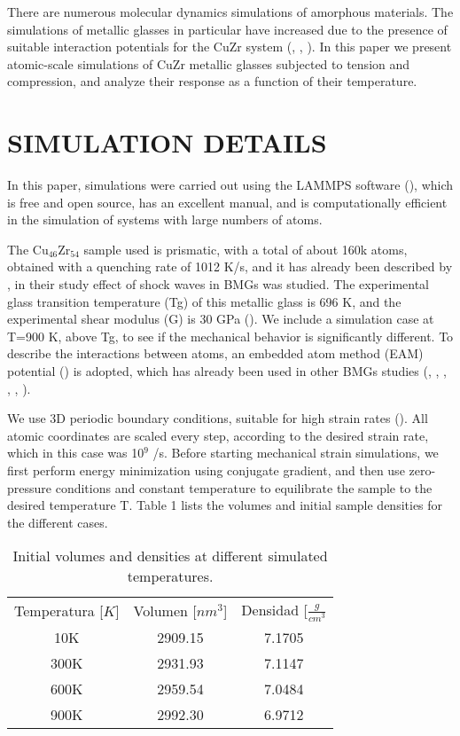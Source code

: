 There are numerous molecular dynamics simulations of amorphous materials. The simulations of metallic glasses in particular have increased due to the presence of suitable interaction potentials for the CuZr system (\cite{ogata06}, \cite{arman10}, \cite{guan10}). In this paper we present atomic-scale simulations of CuZr metallic glasses subjected to tension and compression, and analyze their response as a function of their temperature.

\section{SIMULATION DETAILS}
In this paper, simulations were carried out using the LAMMPS software (\cite{plimpton95}), which is free and open source, has an excellent manual, and is computationally efficient in the simulation of systems with large numbers of atoms.

The Cu$_{46}$Zr$_{54}$ sample used is prismatic, with a total of about 160k atoms, obtained with a quenching rate of 1012 K/s, and it has already been described by \cite{arman10}, in their study effect of shock waves in BMGs was studied. The experimental glass transition temperature (Tg) of this metallic glass is 696 K, and the experimental shear modulus (G) is 30 GPa (\cite{johnson05}). We include a simulation case at T=900 K, above Tg, to see if the mechanical behavior is significantly different. To describe the interactions between atoms, an embedded atom method (EAM) potential (\cite{daw84}) is adopted, which has already been used in other BMGs studies (\cite{shimizu07}, \cite{cao09}, \cite{cheng08}, \cite{arman10}, \cite{cheng11}, \cite{wang12}).

We use 3D periodic boundary conditions, suitable for high strain rates (\cite{bringa05}). All atomic coordinates are scaled every step, according to the desired strain rate, which in this case was 10$^{9}$ /s. Before starting mechanical strain simulations, we first perform energy minimization using conjugate gradient, and then use zero-pressure conditions and constant temperature to equilibrate the sample to the desired temperature T. Table 1 lists the volumes and initial sample densities for the different cases.

\begin{table}[htp]
\caption{Initial volumes and densities at different simulated temperatures.}
\begin{center}
\begin{tabular}{*{3}{c}}
Temperatura [$K$] & Volumen [$nm^{3}$] & Densidad [$\frac{g}{cm^{3}}$ \\
10K & 2909.15 & 7.1705 \\
300K & 2931.93 & 7.1147 \\
600K & 2959.54 & 7.0484 \\
900K & 2992.30 & 6.9712
\end{tabular}
\end{center}
\label{C3:tb:initprops}
\end{table}

